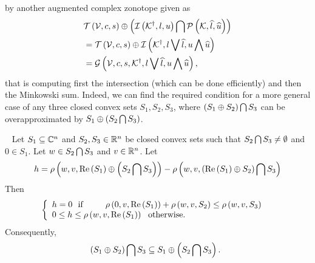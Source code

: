 %
by another augmented complex zonotope given as
%
\begin{align*}
& \mathit{\operatorname{\mathcal{T}}}\left(\mathcal{V},c,s\right)\oplus \left(\mathit{\operatorname{\mathcal{I}}}\left({\mathcal{K}}^\dagger,l,u\right)\bigcap \mathcal{P}\left(\mathcal{K},\widehat{l},\widehat{u}\right)\right)\\
& =
  \mathit{\operatorname{\mathcal{T}}}\left(\mathcal{V},c,s\right)\oplus \mathit{\operatorname{\mathcal{I}}}\left({\mathcal{K}}^\dagger,l\bigvee \widehat{l},u\bigwedge \widehat{u}\right)\\
& = \mathcal{G}\left(\mathcal{V},c,s,{\mathcal{K}}^\dagger,l\bigvee \widehat{l},u\bigwedge \widehat{u}\right),
\end{align*}
%
that is computing first the intersection (which can be done
efficiently) and then the Minkowski sum.  Indeed, we can find the
required condition for a more general case of any three closed convex
sets $S_1,S_2,S_3$, where $\left(S_1\oplus S_2\right)\bigcap S_3$ can be
overapproximated by $S_1\oplus\left(S_2\bigcap S_3\right)$. 
%
\begin{lemma}~\label{lem:gen-int}
Let $S_1\subseteq \mathbb{C}^n$ and $S_2,S_3\in\mathbb{R}^n$ be closed
convex sets such that $S_2\bigcap S_3\neq \emptyset$ and $0\in S_1$.  Let
$w\in S_2\bigcap S_3$ and $v\in\mathbb{R}^n$.  Let 
%
\[
h = \rho\left(w,v,\operatorname{Re}\left(S_1\right)\oplus\left(S_2\bigcap
  S_3\right)\right)-\rho\left(w,v,\left(\operatorname{Re}\left(S_1\right)\oplus S_2\right)\bigcap
  S_3\right) 
\]
%
Then
%
\begin{align}
  &  \left\{
  \begin{array}{l}
   h = 0~~\text{if}~~~~~~~~\rho\left(0,v,\operatorname{Re}\left(S_1\right)\right)+\rho\left(w,v,S_2\right)\leq
   \rho\left(w,v,S_3\right)\\
   0\leq h \leq \rho\left(w,v,\operatorname{Re}\left(S_1\right)\right)~~\text{otherwise}.
  \end{array}
  \right.\label{eqn:support-inequality}
\end{align}
%
Consequently,
%
\begin{align}~\label{eqn:minsum-intersection}
& \left(S_1\oplus S_2\right)\bigcap S_3\subseteq S_1\oplus\left(S_2\bigcap S_3\right).
\end{align}
%
\end{lemma}
%
